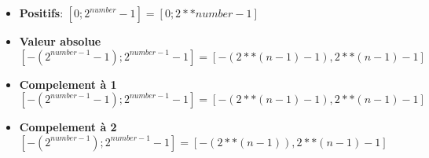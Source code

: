 \begin{itemize}
\item \textbf{Positifs}: $[0; 2^{{ number }}-1] = [0; {{ 2**number-1}}]$
\item \textbf{Valeur absolue} $[-(2^{ {{ number-1 }} }-1 );2^{ {{ number-1 }} }-1] = [-({{ 2**(n-1)-1 }}), {{ 2**(n-1)-1 }}]$
\item \textbf{Compelement à 1} $[-(2^{ {{ number-1 }} }-1 );2^{ {{ number-1 }} }-1] = [-({{ 2**(n-1)-1 }}), {{ 2**(n-1)-1 }}]$
\item \textbf{Compelement à 2} $[-(2^{ {{ number-1 }} } );2^{ {{ number-1 }} }-1] = [-({{ 2**(n-1) }}), {{ 2**(n-1)-1 }}]$
\end{itemize}